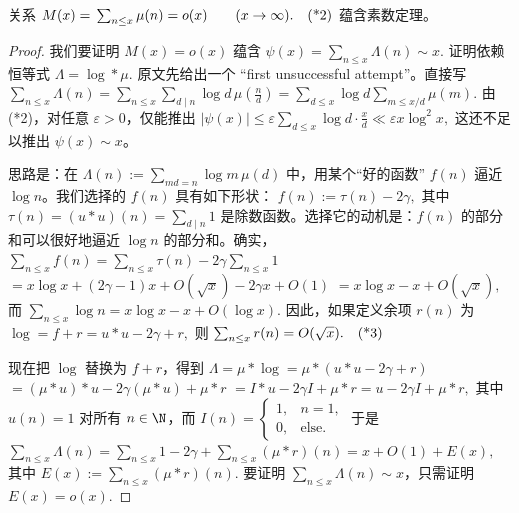 \begin{theorem}[原文 Theorem 3.19]
	关系
	\(\textstyle M(x)=\allowbreak{}\sum_{n\leq\allowbreak{} x}\mu(n)=\allowbreak{}o(x)\qquad (x\to\allowbreak{}\infty). \quad\textup{(*2)}\)
	蕴含素数定理。
\end{theorem}

\begin{proof}
	我们要证明 $M(x)=o(x)$ 蕴含
	\(\textstyle \psi(x)=\allowbreak{}\sum_{n\leq\allowbreak{} x}\Lambda(n)\sim\allowbreak{} x.\)
	证明依赖恒等式
	\(\textstyle \Lambda=\allowbreak{}\log *\mu.\)
	原文先给出一个 “first unsuccessful attempt”。直接写
	\(\textstyle \sum_{n\leq\allowbreak{} x}\Lambda(n) =\allowbreak{} \sum_{n\leq\allowbreak{} x}\sum_{d\mid\allowbreak{} n}\log d\,\mu\left(\frac nd\right) =\allowbreak{} \sum_{d\leq\allowbreak{} x}\log d\sum_{m\leq\allowbreak{} x/d}\mu(m).\)
	由 (*2)，对任意 $\varepsilon>0$，仅能推出
	\(\textstyle |\psi(x)| \leq\allowbreak{} \varepsilon\sum_{d\leq\allowbreak{} x}\log d\cdot \frac xd \ll\allowbreak{} \varepsilon x\log^2 x,\allowbreak{}\)
	这还不足以推出 $\psi(x)\sim x$。

	思路是：在
	\(\textstyle \Lambda(n):=\allowbreak{}\sum_{md=\allowbreak{}n}\log m\,\mu(d)\)
	中，用某个“好的函数” $f(n)$ 逼近 $\log n$。我们选择的 $f(n)$ 具有如下形状：
	\(\textstyle f(n):=\allowbreak{}\tau(n)-2\gamma,\allowbreak{}\)
	其中
	\(\textstyle \tau(n)=\allowbreak{}(u*u)(n)=\allowbreak{}\sum_{d\mid\allowbreak{} n}1\)
	是除数函数。选择它的动机是：$f(n)$ 的部分和可以很好地逼近 $\log n$ 的部分和。确实，
	\(\textstyle \sum_{n\leq\allowbreak{} x}f(n) =\allowbreak{} \sum_{n\leq\allowbreak{} x}\tau(n)-2\gamma\sum_{n\leq\allowbreak{} x}1\) \(\textstyle =\allowbreak{} x\log x+\allowbreak{}(2\gamma-1)x+\allowbreak{}O(\sqrt{x}) -2\gamma x+\allowbreak{}O(1)\) \(\textstyle =\allowbreak{} x\log x-x+\allowbreak{}O(\sqrt{x}),\allowbreak{}\)
	而
	\(\textstyle \sum_{n\leq\allowbreak{} x}\log n =\allowbreak{} x\log x-x+\allowbreak{}O(\log x).\)
	因此，如果定义余项 $r(n)$ 为
	\(\textstyle \log=\allowbreak{}f+\allowbreak{}r=\allowbreak{}u*u-2\gamma+\allowbreak{}r,\allowbreak{}\)
	则
	\(\textstyle \sum_{n\leq\allowbreak{} x}r(n)=\allowbreak{}O(\sqrt{x}). \quad\textup{(*3)}\)

	现在把 $\log$ 替换为 $f+r$，得到
	\(\textstyle \Lambda =\allowbreak{} \mu*\log =\allowbreak{} \mu*(u*u-2\gamma+\allowbreak{}r)\) \(\textstyle =\allowbreak{} (\mu*u)*u-2\gamma(\mu*u)+\allowbreak{}\mu*r\) \(\textstyle =\allowbreak{} I*u-2\gamma I+\allowbreak{}\mu*r =\allowbreak{} u-2\gamma I+\allowbreak{}\mu*r,\allowbreak{}\)
	其中 $u(n)=1$ 对所有 $n\in\N$，而
	\(\textstyle I(n)= \begin{cases} 1, & n=1,\\ 0, & \text{else}. \end{cases}\)
	于是
	\(\textstyle \sum_{n\leq\allowbreak{} x}\Lambda(n) =\allowbreak{} \sum_{n\leq\allowbreak{} x}1-2\gamma+\allowbreak{}\sum_{n\leq\allowbreak{} x}(\mu*r)(n) =\allowbreak{} x+\allowbreak{}O(1)+\allowbreak{}E(x),\allowbreak{}\)
	其中
	\(\textstyle E(x):=\allowbreak{}\sum_{n\leq\allowbreak{} x}(\mu*r)(n).\)
	要证明 $\sum_{n\leq x}\Lambda(n)\sim x$，只需证明
	\(\textstyle E(x)=\allowbreak{}o(x).\)


\end{proof}
